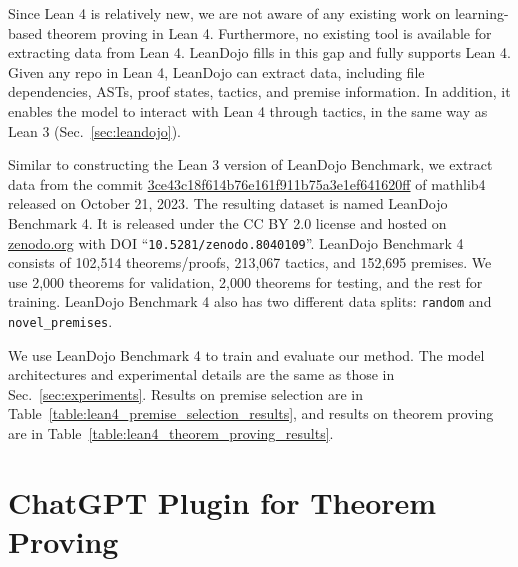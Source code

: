 Since Lean 4 is relatively new, we are not aware of any existing work on learning-based theorem proving in Lean 4. Furthermore, no existing tool is available for extracting data from Lean 4. LeanDojo fills in this gap and fully supports Lean 4. Given any repo in Lean 4, LeanDojo can extract data, including file dependencies, ASTs, proof states, tactics, and premise information. In addition, it enables the model to interact with Lean 4 through tactics, in the same way as Lean 3 (Sec.~\ref{sec:leandojo}). 

Similar to constructing the Lean 3 version of LeanDojo Benchmark, we extract data from the commit \href{https://github.com/leanprover-community/mathlib4/commit/3ce43c18f614b76e161f911b75a3e1ef641620ff}{3ce43c18f614b76e161f911b75a3e1ef641620ff} of mathlib4 released on October 21, 2023. The resulting dataset is named LeanDojo Benchmark 4. It is released under the CC BY 2.0 license and hosted on \href{https://zenodo.org/}{zenodo.org} with DOI ``\texttt{10.5281/zenodo.8040109}''. LeanDojo Benchmark 4 consists of 102,514 theorems/proofs, 213,067 tactics, and 152,695 premises. We use 2,000 theorems for validation, 2,000 theorems for testing, and the rest for training. LeanDojo Benchmark 4 also has two different data splits: \texttt{random} and \texttt{novel\_premises}.

We use LeanDojo Benchmark 4 to train and evaluate our method. The model architectures and experimental details are the same as those in Sec.~\ref{sec:experiments}. Results on premise selection are in Table~\ref{table:lean4_premise_selection_results}, and results on theorem proving are in Table~\ref{table:lean4_theorem_proving_results}. 






\section{ChatGPT Plugin for Theorem Proving}
\label{appendix:chatgpt}

